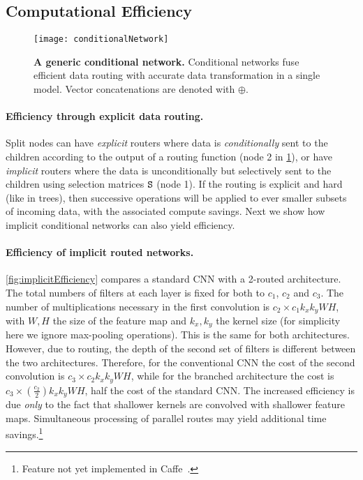 \documentclass[thesis]{subfiles}
\begin{document}
	\subsection{Computational Efficiency}\label{sec:efficiency}
	
	\begin{figure}[tbp]
	\centerline{
	\texttt{[image: conditionalNetwork]}
	}
	   \caption{{\bf A generic conditional network.} 
	   Conditional networks fuse efficient data routing with accurate data transformation in a single model. 
	   Vector concatenations are denoted with $\oplus$.}
	\label{fig:conditionalNetwork}
	\end{figure}
	
	\paragraph{Efficiency through explicit data routing.}
	Split nodes can have {\em explicit} routers where data is {\em conditionally} sent to the children according to the output of a routing function (\eg node 2 in \cref{fig:conditionalNetwork}),
	or have \emph{implicit} routers where the data is unconditionally but selectively sent to the children using selection matrices $\mat S$ (\eg node 1).
	If the routing is explicit and hard (like in trees), then successive operations will be applied to ever smaller subsets of incoming data, with the associated compute savings. 
	Next we show how implicit conditional networks can also yield efficiency. 
	
	\paragraph{Efficiency of implicit routed networks.}
	\cref{fig:implicitEfficiency} compares a standard CNN with a 2-routed
	architecture. The total numbers of filters at each layer is fixed for 
	both to $c_1$, $c_2$ and $c_3$.
	The number of multiplications necessary in the first convolution is 
	$c_2 \times c_1 k_x k_y W H$, with $W, H$ the size of the feature 
	map and $k_x, k_y$ the kernel size (for simplicity here we ignore max-pooling operations).
	This is the same for both architectures.
	However, due to routing, the depth of the second set of filters is different between the two architectures.
	Therefore, for the conventional CNN the cost of the second convolution is 
	$c_3 \times c_2 k_x k_y W H$, while for the branched architecture 
	the cost is $c_3 \times \left( \frac{c_2}{2}\right) k_x k_y W H$, \ie half the cost of the standard CNN. 
	The increased efficiency is due {\em only} to the fact that shallower kernels are convolved with shallower feature maps. 
	Simultaneous processing of parallel routes may yield additional 
	time savings.\footnote{Feature not yet implemented in Caffe~\cite{Jia2014}.}
	
\end{document}
